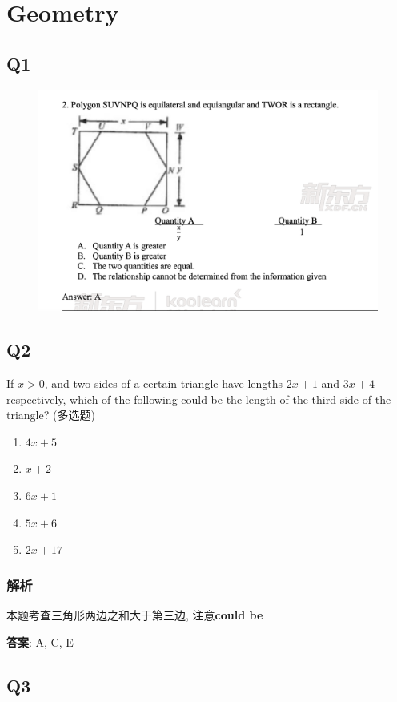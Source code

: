 \chapter{Geometry}

\section{Q1}

  \begin{figure}[H]
    \centering
    \includegraphics[width=0.7\columnwidth]{images/areas/geometry/q1}
  \end{figure}

\section{Q2}

  If $ x > 0 $, and two sides of a certain triangle have lengths $ 2 x + 1 $
  and $ 3 x + 4 $ respectively, which of the following could be the length of
  the third side of the triangle? (多选题)

  \begin{enumerate}
    \item $ 4x + 5 $
    \item $ x + 2 $
    \item $ 6x + 1 $
    \item $ 5x + 6 $
    \item $ 2x + 17 $
  \end{enumerate}

  \subsection{解析}

    本题考查三角形两边之和大于第三边, 注意\textbf{could be}

    \textbf{答案}: A, C, E

\section{Q3}

